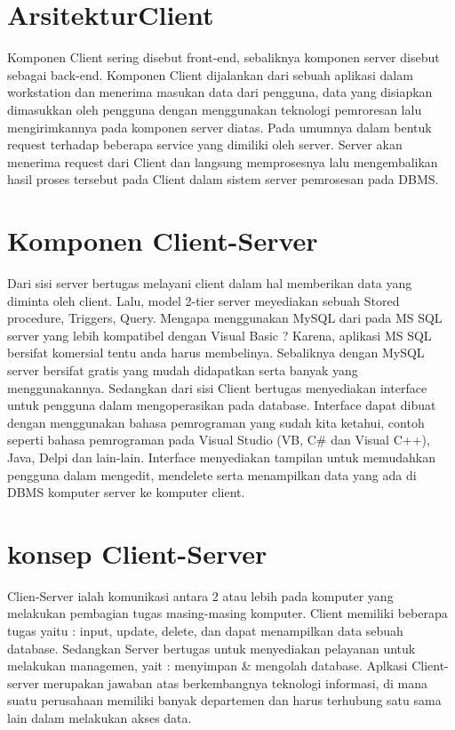 {\section{ArsitekturClient}
Komponen Client sering disebut front-end, sebaliknya komponen server disebut sebagai back-end. 
Komponen Client dijalankan dari sebuah aplikasi dalam workstation dan menerima masukan data dari pengguna, data yang disiapkan dimasukkan oleh pengguna dengan menggunakan teknologi pemroresan lalu mengirimkannya pada komponen server diatas. 
Pada umumnya dalam bentuk request terhadap beberapa service yang dimiliki oleh server. 
Server akan menerima request dari Client dan langsung memprosesnya lalu mengembalikan hasil proses tersebut pada Client dalam sistem server pemrosesan pada DBMS.

\section{Komponen Client-Server}
Dari sisi server bertugas melayani client dalam hal memberikan data yang diminta oleh client.
Lalu, model 2-tier server meyediakan sebuah Stored procedure, Triggers, Query. 
Mengapa menggunakan MySQL dari pada MS SQL server yang lebih kompatibel dengan Visual Basic ? Karena, aplikasi MS SQL bersifat komersial tentu anda harus membelinya. 
Sebaliknya dengan MySQL server bersifat gratis yang mudah didapatkan serta banyak yang menggunakannya. Sedangkan dari sisi Client bertugas menyediakan interface untuk pengguna dalam mengoperasikan pada database. 
Interface dapat dibuat dengan menggunakan bahasa pemrograman yang sudah kita ketahui, contoh seperti bahasa pemrograman pada Visual Studio (VB, C# dan Visual C++), Java, Delpi dan lain-lain. 
Interface menyediakan tampilan untuk memudahkan pengguna dalam mengedit, mendelete serta menampilkan data yang ada di DBMS komputer server ke komputer client.

\section{konsep Client-Server}
Clien-Server ialah komunikasi antara 2 atau lebih pada komputer yang melakukan pembagian tugas masing-masing komputer. Client memiliki beberapa tugas yaitu : input, update, delete, dan dapat menampilkan data sebuah database. Sedangkan Server bertugas untuk menyediakan pelayanan untuk melakukan managemen, yait : menyimpan & mengolah database. Aplkasi Client-server merupakan jawaban atas berkembangnya teknologi informasi, di mana suatu perusahaan memiliki banyak departemen dan harus terhubung satu sama lain dalam melakukan akses data.

}
